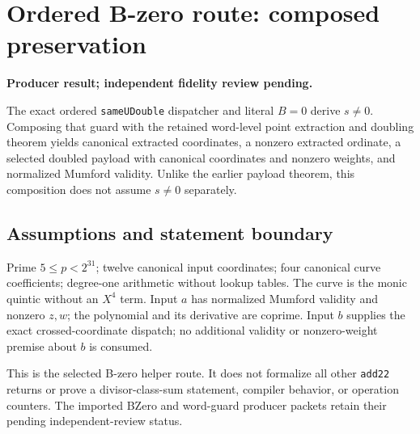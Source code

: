 \documentclass[10pt]{article}
\begin{document}
\section*{Ordered B-zero route: composed preservation}
\textbf{Producer result; independent fidelity review pending.}

The exact ordered \texttt{sameUDouble} dispatcher and literal $B=0$ derive $s\ne0$. Composing that guard with the retained word-level point extraction and doubling theorem yields canonical extracted coordinates, a nonzero extracted ordinate, a selected doubled payload with canonical coordinates and nonzero weights, and normalized Mumford validity. Unlike the earlier payload theorem, this composition does not assume $s\ne0$ separately.

\begin{center}\end{center}
\subsection*{Assumptions and statement boundary}
Prime $5\le p<2^{31}$; twelve canonical input coordinates; four canonical curve coefficients; degree-one arithmetic without lookup tables. The curve is the monic quintic without an $X^4$ term. Input $a$ has normalized Mumford validity and nonzero $z,w$; the polynomial and its derivative are coprime. Input $b$ supplies the exact crossed-coordinate dispatch; no additional validity or nonzero-weight premise about $b$ is consumed.

This is the selected B-zero helper route. It does not formalize all other \texttt{add22} returns or prove a divisor-class-sum statement, compiler behavior, or operation counters. The imported BZero and word-guard producer packets retain their pending independent-review status.
\end{document}
